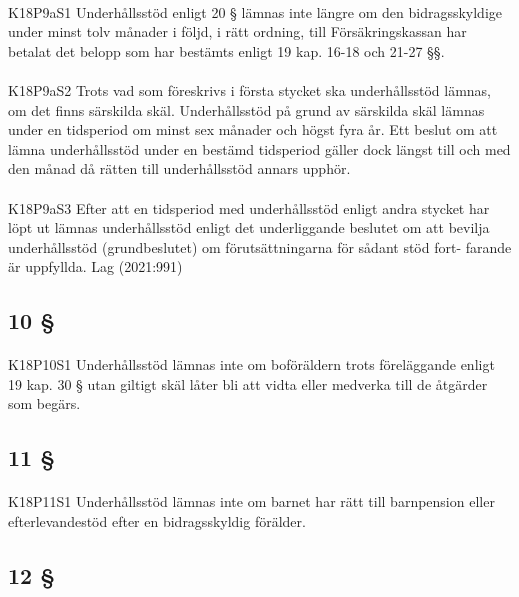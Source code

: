 \documentclass[a4paper,notitlepage,openany,10pt]{book}
\begin{document}
\paragraph*{}
{\tiny K18P9aS1}
Underhållsstöd enligt 20 § lämnas inte längre om den bidragsskyldige under minst tolv månader i följd, i rätt ordning, till Försäkringskassan har betalat det belopp som har bestämts enligt 19 kap. 16-18 och 21-27 §§.
\paragraph*{}
{\tiny K18P9aS2}
Trots vad som föreskrivs i första stycket ska underhållsstöd lämnas, om det finns särskilda skäl. Underhållsstöd på grund av särskilda skäl lämnas under en tidsperiod om minst sex månader och högst fyra år. Ett beslut om att lämna underhållsstöd under en bestämd tidsperiod gäller dock längst till och med den månad då rätten till underhållsstöd annars upphör.
\paragraph*{}
{\tiny K18P9aS3}
Efter att en tidsperiod med underhållsstöd enligt andra stycket har löpt ut lämnas underhållsstöd enligt det underliggande beslutet om att bevilja underhållsstöd (grundbeslutet) om förutsättningarna för sådant stöd fort- farande är uppfyllda.
Lag (2021:991)
\subsection*{10 §}
\paragraph*{}
{\tiny K18P10S1}
Underhållsstöd lämnas inte om boföräldern trots föreläggande enligt 19 kap. 30 § utan giltigt skäl låter bli att vidta eller medverka till de åtgärder som begärs.
\subsection*{11 §}
\paragraph*{}
{\tiny K18P11S1}
Underhållsstöd lämnas inte om barnet har rätt till barnpension eller efterlevandestöd efter en bidragsskyldig förälder.
\subsection*{12 §}
\end{document}
